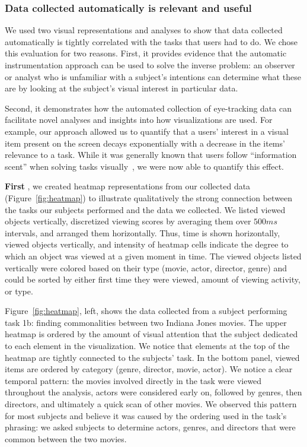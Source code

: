 \subsubsection{Data collected automatically is relevant and useful}
\label{sec:EvalDataCollected}

We used two visual representations and analyses to show that data collected automatically is tightly correlated with the tasks that users had to do. We chose this evaluation for two reasons. First, it provides evidence that the automatic instrumentation approach can be used to solve the inverse problem: an observer or analyst who is unfamiliar with a subject's intentions can determine what these are by looking at the subject's visual interest in particular data. 

Second, it demonstrates how the automated collection of eye-tracking data can facilitate novel analyses and insights into how visualizations are used. For example, our approach allowed us to quantify that a users' interest in a visual item present on the screen decays exponentially with a decrease in the items' relevance to a task. While it was generally known that users follow ``information scent'' when solving tasks visually~\cite{informationscent2003},  we were now able to quantify this effect. 
 
\vspace{2mm}\noindent
\textbf{First }, we created heatmap representations from our collected data (Figure~\ref{fig:heatmap}) to illustrate qualitatively the strong connection between the tasks our subjects performed and the data we collected. We listed viewed objects vertically, discretized viewing scores by averaging them over $500ms$ intervals, and arranged them horizontally. Thus, time is shown horizontally, viewed objects vertically, and intensity of heatmap cells indicate the degree to which an object was viewed at a given moment in time. The viewed objects listed vertically were colored based on their type (movie, actor, director, genre) and could be sorted by either first time they were viewed, amount of viewing activity, or type.

Figure~\ref{fig:heatmap}, left, shows the data collected from a subject performing task 1b: finding commonalities between two Indiana Jones movies. The upper heatmap is ordered by the amount of visual attention that the subject dedicated to each element in the visualization. We notice that elements at the top of the heatmap are tightly connected to the subjects'  task.   In the bottom panel, viewed items are ordered by category (genre, director, movie, actor). We notice a clear temporal pattern: the movies involved directly in the task were viewed throughout the analysis, actors were considered early on, followed by genres, then directors, and ultimately a quick scan of other movies. We observed this pattern for most subjects and believe it was caused by the ordering used in the task's phrasing: we asked subjects to determine actors, genres, and directors that were common between the two movies.   

